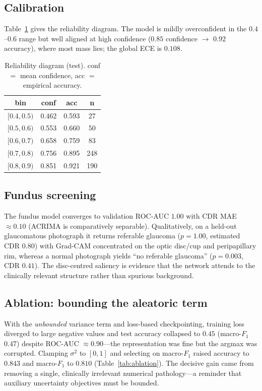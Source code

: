 \documentclass[10pt,twocolumn]{article}
\begin{document}
\subsection{Calibration}
Table~\ref{tab:rel} gives the reliability diagram. The model is mildly overconfident
in the $0.4$--$0.6$ range but well aligned at high confidence ($0.85$ confidence
$\rightarrow$ $0.92$ accuracy), where most mass lies; the global ECE is $0.108$.

\begin{table}[t]
\centering
\caption{Reliability diagram (test). conf $=$ mean confidence, acc $=$ empirical accuracy.}
\label{tab:rel}
\small
\begin{tabular}{cccc}
\toprule
bin & conf & acc & n \\
\midrule
$[0.4,0.5)$ & 0.462 & 0.593 & 27 \\
$[0.5,0.6)$ & 0.553 & 0.660 & 50 \\
$[0.6,0.7)$ & 0.658 & 0.759 & 83 \\
$[0.7,0.8)$ & 0.756 & 0.895 & 248 \\
$[0.8,0.9)$ & 0.851 & 0.921 & 190 \\
\bottomrule
\end{tabular}
\end{table}

\subsection{Fundus screening}
The fundus model converges to validation ROC-AUC $1.00$ with CDR MAE $\approx0.10$
(ACRIMA is comparatively separable). Qualitatively, on a held-out glaucomatous
photograph it returns referable glaucoma ($p{=}1.00$, estimated CDR $0.80$) with
Grad-CAM concentrated on the optic disc/cup and peripapillary rim, whereas a normal
photograph yields ``no referable glaucoma'' ($p{=}0.003$, CDR $0.41$). The
disc-centred saliency is evidence that the network attends to the clinically relevant
structure rather than spurious background.

\subsection{Ablation: bounding the aleatoric term}
\label{sec:ablation}
With the \emph{unbounded} variance term and loss-based checkpointing, training loss
diverged to large negative values and test accuracy collapsed to $0.45$
(macro-$F_1$ $0.47$) despite ROC-AUC $\approx0.90$---the representation was fine but
the argmax was corrupted. Clamping $\sigma^2$ to $[0,1]$ and selecting on macro-$F_1$
raised accuracy to $0.843$ and macro-$F_1$ to $0.810$
(Table~\ref{tab:ablation}). The decisive gain came from removing a single,
clinically irrelevant numerical pathology---a reminder that auxiliary
uncertainty objectives must be bounded.
\end{document}
